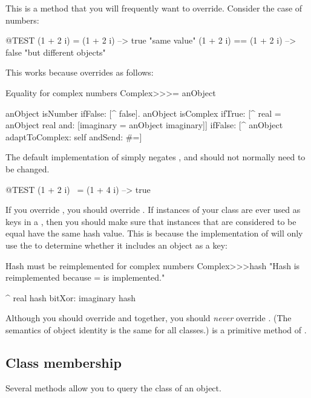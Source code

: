 \documentclass[a4paper,10pt,twoside]{book}
\begin{document}
This is a method that you will frequently want to override.
Consider the case of  numbers:

\begin{code}{@TEST}
(1 + 2 i) = (1 + 2 i)   --> true     "same value"
(1 + 2 i) == (1 + 2 i) --> false    "but different objects"
\end{code}

This works because  overrides \ct{=} as follows:
\begin{method}{Equality for complex numbers}
Complex>>>= anObject

	anObject isNumber ifFalse: [^ false].
	anObject isComplex
		ifTrue: [^ real = anObject real and: [imaginary = anObject imaginary]]
		ifFalse: [^ anObject adaptToComplex: self andSend: #=]
\end{method}

The default implementation of  simply negates , and should not normally need to be changed.

\begin{code}{@TEST}
(1 + 2 i) ~= (1 + 4 i) --> true
\end{code}

If you override \ct{=}, you should override .
If instances of your class are ever used as keys in a , then you should make sure that instances that are considered to be equal have the same hash value. This is because the implementation of  will only use the  to determine whether it includes an object as a key:
\begin{method}{Hash must be reimplemented for complex numbers}
Complex>>>hash
    "Hash is reimplemented because = is implemented."

    ^ real hash bitXor: imaginary hash
\end{method}

Although you should override \ct{=} and  together, you should \emph{never} override \ct{==}.
(The semantics of object identity is the same for all classes.)
\ct{==} is a primitive method of .


\subsection{Class membership}
Several methods allow you to query the class of an object. 
\end{document}

